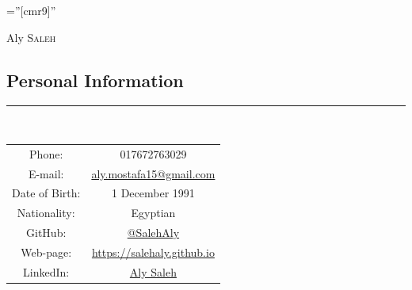 \documentclass[a4paper,13pt]{article}
\begin{document}
\pagestyle{empty} %

\font\fb=''[cmr9]'' %


\par{\hspace{5cm}\huge Aly \textsc{Saleh}\par} %



\begin{adjustwidth}{-3cm}{}

\section{Personal Information}
\rule[0pt]{20cm}{0.5pt}\\

\begin{center}
	
\begin{tabular}{ c c }
	Phone: & 017672763029\\
	
	E-mail:& \href{mailto:aly.mostafa15@gmail.com}{aly.mostafa15@gmail.com} \\
	
	Date of Birth:& 1 December 1991 \\
	
	Nationality:& Egyptian \\

	GitHub:&  \href{https://github.com/SalehAly}{@SalehAly}\\
	Web-page:& \href{https://salehaly.github.io}{https://salehaly.github.io}\\
	LinkedIn: &\href{https://de.linkedin.com/in/aly-saleh-ba948164}{Aly Saleh}\\

\end{tabular}


\end{center}

	\begin{figure}[h]
	

\end{figure}
\end{adjustwidth}
\end{document}
